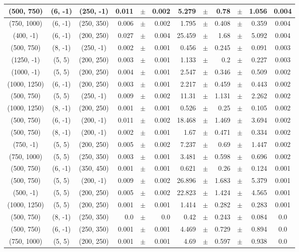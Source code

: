 \documentclass[12pt]{paper}
\begin{document}
\begin{table}[ht]
\begin{center}
{\begin{tabular}{|c|c|c|rrr|rrrrr|c|}
(500, 750)&(6, -1)&(250, -1)&0.011&$\pm$&0.002&5.279&$\pm$&0.78&$\pm$&1.056&0.004\\\hline
(750, 1000)&(6, -1)&(250, 350)&0.006&$\pm$&0.002&1.795&$\pm$&0.408&$\pm$&0.359&0.004\\\hline
(400, -1)&(6, -1)&(200, 250)&0.027&$\pm$&0.004&25.459&$\pm$&1.68&$\pm$&5.092&0.004\\\hline
(500, 750)&(8, -1)&(250, -1)&0.002&$\pm$&0.001&0.456&$\pm$&0.245&$\pm$&0.091&0.003\\\hline
(1250, -1)&(5, 5)&(200, 250)&0.003&$\pm$&0.001&1.133&$\pm$&0.2&$\pm$&0.227&0.003\\\hline
(1000, -1)&(5, 5)&(200, 250)&0.004&$\pm$&0.001&2.547&$\pm$&0.346&$\pm$&0.509&0.002\\\hline
(1000, 1250)&(6, -1)&(200, 250)&0.003&$\pm$&0.001&2.217&$\pm$&0.459&$\pm$&0.443&0.002\\\hline
(500, 750)&(5, 5)&(250, -1)&0.009&$\pm$&0.002&11.31&$\pm$&1.131&$\pm$&2.262&0.002\\\hline
(1000, 1250)&(8, -1)&(200, 250)&0.001&$\pm$&0.001&0.526&$\pm$&0.25&$\pm$&0.105&0.002\\\hline
(500, 750)&(6, -1)&(200, -1)&0.011&$\pm$&0.002&18.468&$\pm$&1.469&$\pm$&3.694&0.002\\\hline
(500, 750)&(8, -1)&(200, -1)&0.002&$\pm$&0.001&1.67&$\pm$&0.471&$\pm$&0.334&0.002\\\hline
(750, -1)&(5, 5)&(200, 250)&0.005&$\pm$&0.002&7.237&$\pm$&0.69&$\pm$&1.447&0.002\\\hline
(750, 1000)&(5, 5)&(250, 350)&0.003&$\pm$&0.001&3.481&$\pm$&0.598&$\pm$&0.696&0.002\\\hline
(500, 750)&(6, -1)&(350, 450)&0.001&$\pm$&0.001&0.621&$\pm$&0.26&$\pm$&0.124&0.001\\\hline
(500, 750)&(5, 5)&(200, -1)&0.009&$\pm$&0.002&26.896&$\pm$&1.683&$\pm$&5.379&0.001\\\hline
(500, -1)&(5, 5)&(200, 250)&0.005&$\pm$&0.002&22.823&$\pm$&1.424&$\pm$&4.565&0.001\\\hline
(1000, 1250)&(5, 5)&(200, 250)&0.001&$\pm$&0.001&1.414&$\pm$&0.282&$\pm$&0.283&0.001\\\hline
(500, 750)&(8, -1)&(250, 350)&0.0&$\pm$&0.0&0.42&$\pm$&0.243&$\pm$&0.084&0.0\\\hline
(500, 750)&(6, -1)&(250, 350)&0.001&$\pm$&0.001&4.469&$\pm$&0.729&$\pm$&0.894&0.0\\\hline
(750, 1000)&(5, 5)&(200, 250)&0.001&$\pm$&0.001&4.69&$\pm$&0.597&$\pm$&0.938&0.0\\\hline

\end{tabular}}
\end{center}
\end{table}
\end{document}
